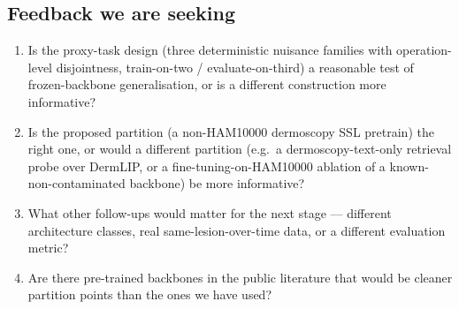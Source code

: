 \subsection{Feedback we are seeking}
\begin{enumerate}[leftmargin=2em]
\item Is the proxy-task design (three deterministic nuisance families with
      operation-level disjointness, train-on-two / evaluate-on-third) a
      reasonable test of frozen-backbone generalisation, or is a different
      construction more informative?
\item Is the proposed partition (a non-HAM10000 dermoscopy SSL pretrain) the
      right one, or would a different partition (e.g.\ a dermoscopy-text-only
      retrieval probe over DermLIP, or a fine-tuning-on-HAM10000 ablation of
      a known-non-contaminated backbone) be more informative?
\item What other follow-ups would matter for the next stage --- different
      architecture classes, real same-lesion-over-time data, or a different
      evaluation metric?
\item Are there pre-trained backbones in the public literature that would be
      cleaner partition points than the ones we have used?
\end{enumerate}
